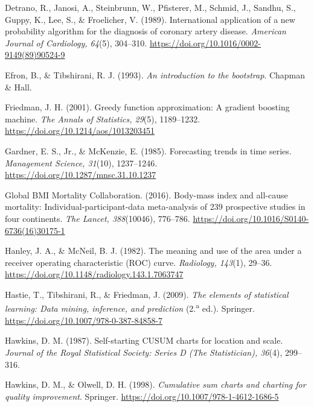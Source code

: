 \documentclass[12pt,letterpaper]{article}
\begin{document}
\begin{enumerate}[label={[\arabic*]}, leftmargin=2.2em]
\item Detrano, R., Janosi, A., Steinbrunn, W., Pfisterer, M., Schmid, J.,
Sandhu, S., Guppy, K., Lee, S., \& Froelicher, V. (1989). International
application of a new probability algorithm for the diagnosis of coronary artery
disease. \textit{American Journal of Cardiology, 64}(5), 304--310.
\url{https://doi.org/10.1016/0002-9149(89)90524-9}

\item Efron, B., \& Tibshirani, R. J. (1993). \textit{An introduction to the
bootstrap}. Chapman \& Hall.

\item Friedman, J. H. (2001). Greedy function approximation: A gradient boosting
machine. \textit{The Annals of Statistics, 29}(5), 1189--1232.
\url{https://doi.org/10.1214/aos/1013203451}

\item Gardner, E. S., Jr., \& McKenzie, E. (1985). Forecasting trends in time
series. \textit{Management Science, 31}(10), 1237--1246.
\url{https://doi.org/10.1287/mnsc.31.10.1237}

\item Global BMI Mortality Collaboration. (2016). Body-mass index and all-cause
mortality: Individual-participant-data meta-analysis of 239 prospective studies
in four continents. \textit{The Lancet, 388}(10046), 776--786.
\url{https://doi.org/10.1016/S0140-6736(16)30175-1}

\item Hanley, J. A., \& McNeil, B. J. (1982). The meaning and use of the area
under a receiver operating characteristic (ROC) curve. \textit{Radiology,
143}(1), 29--36. \url{https://doi.org/10.1148/radiology.143.1.7063747}

\item Hastie, T., Tibshirani, R., \& Friedman, J. (2009). \textit{The elements
of statistical learning: Data mining, inference, and prediction} (2.\textsuperscript{a} ed.).
Springer. \url{https://doi.org/10.1007/978-0-387-84858-7}

\item Hawkins, D. M. (1987). Self-starting CUSUM charts for location and scale.
\textit{Journal of the Royal Statistical Society: Series D (The Statistician),
36}(4), 299--316.

\item Hawkins, D. M., \& Olwell, D. H. (1998). \textit{Cumulative sum charts and
charting for quality improvement}. Springer.
\url{https://doi.org/10.1007/978-1-4612-1686-5}


\end{enumerate}
\end{document}
